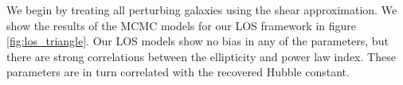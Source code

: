 We begin by treating all perturbing galaxies using the shear approximation. We show the results of the MCMC models for our LOS framework in figure \ref{fig:los_triangle}. Our LOS models show no bias in any of the parameters, but there are strong correlations between the ellipticity and power law index. These parameters are in turn correlated with the recovered Hubble constant. 